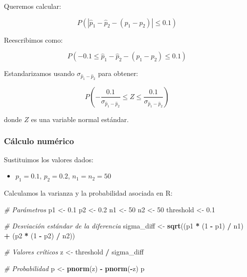 \documentclass[
]{article}
\newenvironment{Shaded}{\begin{snugshade}}{\end{snugshade}}
\newcommand{\CommentTok}[1]{\textcolor[rgb]{0.56,0.35,0.01}{\textit{#1}}}
\newcommand{\DecValTok}[1]{\textcolor[rgb]{0.00,0.00,0.81}{#1}}
\newcommand{\FloatTok}[1]{\textcolor[rgb]{0.00,0.00,0.81}{#1}}
\newcommand{\FunctionTok}[1]{\textcolor[rgb]{0.13,0.29,0.53}{\textbf{#1}}}
\newcommand{\NormalTok}[1]{#1}
\newcommand{\OtherTok}[1]{\textcolor[rgb]{0.56,0.35,0.01}{#1}}
\newcommand{\SpecialCharTok}[1]{\textcolor[rgb]{0.81,0.36,0.00}{\textbf{#1}}}
\providecommand{\tightlist}{%
  \setlength{\itemsep}{0pt}\setlength{\parskip}{0pt}}
\begin{document}
Queremos calcular:

\[
P(|\hat{p}_1 - \hat{p}_2 - (p_1 - p_2)| \leq 0.1)
\]

Reescribimos como:

\[
P\left(-0.1 \leq \hat{p}_1 - \hat{p}_2 - (p_1 - p_2) \leq 0.1\right)
\]

Estandarizamos usando \(\sigma_{\hat{p}_1 - \hat{p}_2}\) para obtener:

\[
P\left(-\frac{0.1}{\sigma_{\hat{p}_1 - \hat{p}_2}} \leq Z \leq \frac{0.1}{\sigma_{\hat{p}_1 - \hat{p}_2}}\right)
\]

donde \(Z\) es una variable normal estándar.

\subsubsection{Cálculo numérico}\label{cuxe1lculo-numuxe9rico-1}

Sustituimos los valores dados:

\begin{itemize}
\tightlist
\item
  \(p_1 = 0.1\), \(p_2 = 0.2\), \(n_1 = n_2 = 50\)
\end{itemize}

Calculamos la varianza y la probabilidad asociada en R:

\begin{Shaded}
\begin{Highlighting}[]
\CommentTok{\# Parámetros}
\NormalTok{p1 }\OtherTok{\textless{}{-}} \FloatTok{0.1}
\NormalTok{p2 }\OtherTok{\textless{}{-}} \FloatTok{0.2}
\NormalTok{n1 }\OtherTok{\textless{}{-}} \DecValTok{50}
\NormalTok{n2 }\OtherTok{\textless{}{-}} \DecValTok{50}
\NormalTok{threshold }\OtherTok{\textless{}{-}} \FloatTok{0.1}

\CommentTok{\# Desviación estándar de la diferencia}
\NormalTok{sigma\_diff }\OtherTok{\textless{}{-}} \FunctionTok{sqrt}\NormalTok{((p1 }\SpecialCharTok{*}\NormalTok{ (}\DecValTok{1} \SpecialCharTok{{-}}\NormalTok{ p1) }\SpecialCharTok{/}\NormalTok{ n1) }\SpecialCharTok{+}\NormalTok{ (p2 }\SpecialCharTok{*}\NormalTok{ (}\DecValTok{1} \SpecialCharTok{{-}}\NormalTok{ p2) }\SpecialCharTok{/}\NormalTok{ n2))}

\CommentTok{\# Valores críticos}
\NormalTok{z }\OtherTok{\textless{}{-}}\NormalTok{ threshold }\SpecialCharTok{/}\NormalTok{ sigma\_diff}

\CommentTok{\# Probabilidad}
\NormalTok{p }\OtherTok{\textless{}{-}} \FunctionTok{pnorm}\NormalTok{(z) }\SpecialCharTok{{-}} \FunctionTok{pnorm}\NormalTok{(}\SpecialCharTok{{-}}\NormalTok{z)}
\NormalTok{p}
\end{Highlighting}
\end{Shaded}
\end{document}
